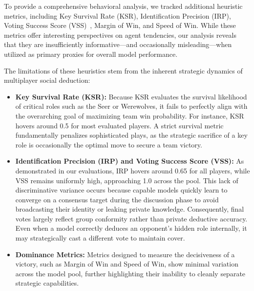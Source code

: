 \documentclass{article}
\begin{document}
To provide a comprehensive behavioral analysis, we tracked additional heuristic metrics, including Key Survival Rate (KSR), Identification Precision (IRP), Voting Success Score (VSS)~\citep{tang2025dsgbench}, Margin of Win, and Speed of Win. While these metrics offer interesting perspectives on agent tendencies, our analysis reveals that they are insufficiently informative---and occasionally misleading---when utilized as primary proxies for overall model performance.

The limitations of these heuristics stem from the inherent strategic dynamics of multiplayer social deduction:

\begin{itemize}
    \item \textbf{Key Survival Rate (KSR):} Because KSR evaluates the survival likelihood of critical roles such as the Seer or Werewolves, it fails to perfectly align with the overarching goal of maximizing team win probability. For instance, KSR hovers around 0.5 for most evaluated players. A strict survival metric fundamentally penalizes sophisticated plays, as the strategic sacrifice of a key role is occasionally the optimal move to secure a team victory.
    \item \textbf{Identification Precision (IRP) and Voting Success Score (VSS):} As demonstrated in our evaluations, IRP hovers around 0.65 for all players, while VSS remains uniformly high, approaching 1.0 across the pool. This lack of discriminative variance occurs because capable models quickly learn to converge on a consensus target during the discussion phase to avoid broadcasting their identity or leaking private knowledge. Consequently, final votes largely reflect group conformity rather than private deductive accuracy. Even when a model correctly deduces an opponent's hidden role internally, it may strategically cast a different vote to maintain cover.
    \item \textbf{Dominance Metrics:} Metrics designed to measure the decisiveness of a victory, such as Margin of Win and Speed of Win, show minimal variation across the model pool, further highlighting their inability to cleanly separate strategic capabilities.
\end{itemize}
\end{document}
